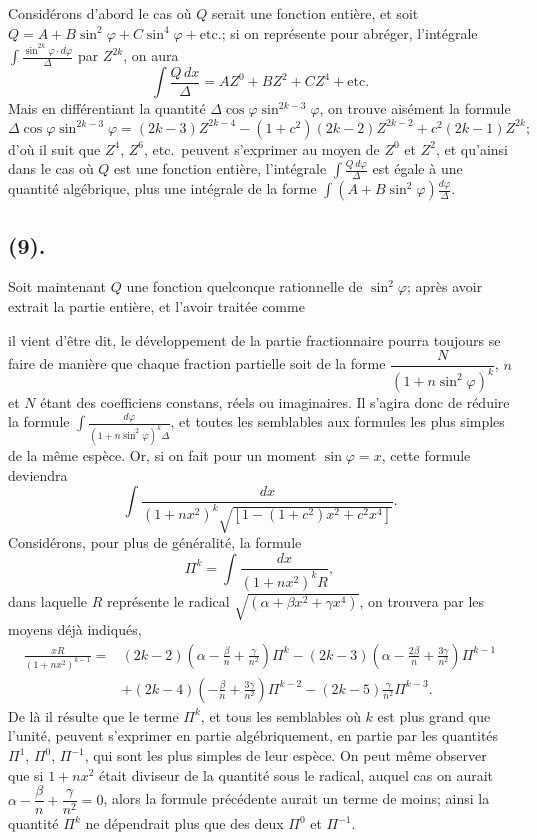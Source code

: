 \documentclass{article}
\begin{document}
Considérons d'abord le cas où $Q$ serait une fonction entière, et soit $Q=A+B\sin^{2}\varphi+C\sin^{4}\varphi+\text{etc.}$; si on représente pour abréger, l'intégrale $\displaystyle\int\frac{\sin^{2k}\varphi\cdot d\varphi}{\Delta}$ par $Z^{2k}$, on aura
\[ \int\frac{Q\,dx}{\Delta}=AZ^{0}+BZ^{2}+CZ^{4}+\text{etc.} \]
Mais en différentiant la quantité $\Delta\cos\varphi\sin^{2k-3}\varphi$, on trouve aisément la formule
\[ \Delta\cos\varphi\sin^{2k-3}\varphi=(2k-3)Z^{2k-4}-(1+c^{2})(2k-2)Z^{2k-2}+c^{2}(2k-1)Z^{2k}; \]
d'où il suit que $Z^{4}$, $Z^{6}$, etc.\ peuvent s'exprimer au moyen de $Z^{0}$ et $Z^{2}$, et qu'ainsi dans le cas où $Q$ est une fonction entière, l'intégrale $\displaystyle\int\frac{Q\,d\varphi}{\Delta}$ est égale à une quantité algébrique, plus une intégrale de la forme $\displaystyle\int(A+B\sin^{2}\varphi)\frac{d\varphi}{\Delta}$.

\subsection*{(9).}

Soit maintenant $Q$ une fonction quelconque rationnelle de $\sin^{2}\varphi$; après avoir extrait la partie entière, et l'avoir traitée comme

il vient d'être dit, le développement de la partie fractionnaire pourra toujours se faire de manière que chaque fraction partielle soit de la forme $\dfrac{N}{(1+n\sin^{2}\varphi)^{k}}$, $n$ et $N$ étant des coefficiens constans, réels ou imaginaires. Il s'agira donc de réduire la formule $\displaystyle\int\frac{d\varphi}{(1+n\sin^{2}\varphi)^{k}\Delta}$, et toutes les semblables aux formules les plus simples de la même espèce. Or, si on fait pour un moment $\sin\varphi=x$, cette formule deviendra
\[ \int\frac{dx}{(1+nx^{2})^{k}\sqrt{[1-(1+c^{2})x^{2}+c^{2}x^{4}]}}. \]
Considérons, pour plus de généralité, la formule
\[ \Pi^{k}=\int\frac{dx}{(1+nx^{2})^{k}R}, \]
dans laquelle $R$ représente le radical $\sqrt{(\alpha+\beta x^{2}+\gamma x^{4})}$, on trouvera par les moyens déjà indiqués,
\[ \begin{aligned} \frac{xR}{(1+nx^{2})^{k-1}}={}&(2k-2)\left(\alpha-\frac{\beta}{n}+\frac{\gamma}{n^{2}}\right)\Pi^{k}-(2k-3)\left(\alpha-\frac{2\beta}{n}+\frac{3\gamma}{n^{2}}\right)\Pi^{k-1}\\ &+(2k-4)\left(-\frac{\beta}{n}+\frac{3\gamma}{n^{2}}\right)\Pi^{k-2}-(2k-5)\frac{\gamma}{n^{2}}\Pi^{k-3}. \end{aligned} \]
De là il résulte que le terme $\Pi^{k}$, et tous les semblables où $k$ est plus grand que l'unité, peuvent s'exprimer en partie algébriquement, en partie par les quantités $\Pi^{1}$, $\Pi^{0}$, $\Pi^{-1}$, qui sont les plus simples de leur espèce. On peut même observer que si $1+nx^{2}$ était diviseur de la quantité sous le radical, auquel cas on aurait $\alpha-\dfrac{\beta}{n}+\dfrac{\gamma}{n^{2}}=0$, alors la formule précédente aurait un terme de moins; ainsi la quantité $\Pi^{k}$ ne dépendrait plus que des deux $\Pi^{0}$ et $\Pi^{-1}$.
\end{document}
